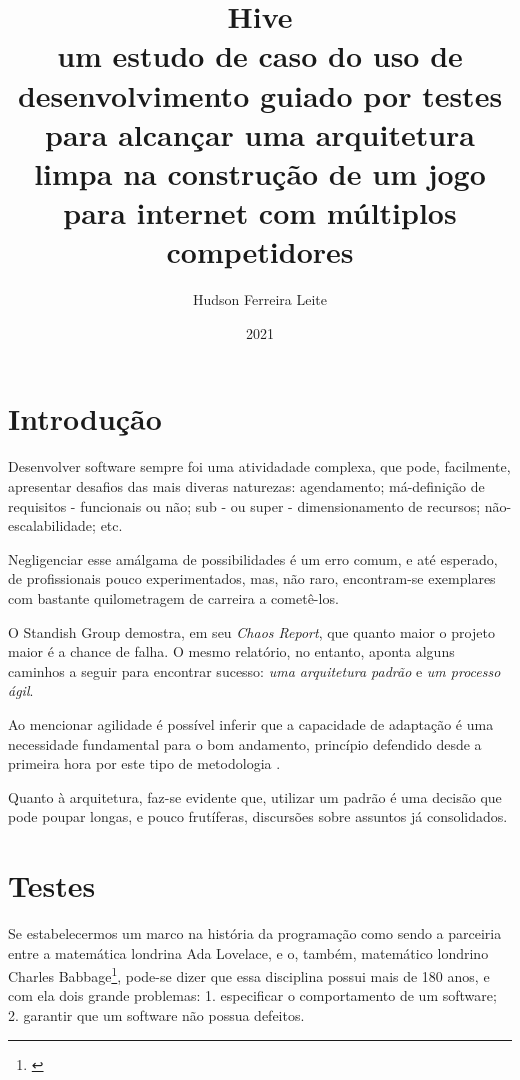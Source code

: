 \documentclass[12pt,a4paper,oneside,english,brazil]{article}
\title{
      \textbf{Hive} \\
      \large um estudo de caso do uso de desenvolvimento guiado por testes para
      alcançar uma arquitetura limpa na construção de um jogo para internet com
      múltiplos competidores
    }
\author{Hudson Ferreira Leite}
\date{2021}
\begin{document}
  \maketitle




  \clearpage

  \section{Introdução}

    Desenvolver software sempre foi uma atividadade complexa, que pode,
    facilmente,  apresentar desafios das mais diveras naturezas: agendamento;
    má-definição de  requisitos - funcionais ou não; sub - ou super -
    dimensionamento de recursos; não-escalabilidade; etc.

    Negligenciar esse amálgama de possibilidades é um erro comum, e até
    esperado, de profissionais pouco experimentados, mas, não raro,
    encontram-se exemplares com bastante quilometragem de carreira a
    cometê-los.

    O Standish Group demostra, em seu \emph{Chaos Report}\cite{ChaosReport2015},
    que quanto maior o projeto maior é a chance de falha. O mesmo relatório, no
    entanto, aponta alguns caminhos a seguir para encontrar sucesso: \emph{uma
    arquitetura padrão} e \emph{um processo ágil}.

    Ao mencionar agilidade é possível inferir que a capacidade de adaptação é
    uma  necessidade fundamental para o bom andamento, princípio defendido desde
    a  primeira hora por este tipo de metodologia \cite{ManifestoAgil2001}.

    Quanto à  arquitetura, faz-se evidente que, utilizar um padrão é uma decisão
    que  pode poupar longas, e pouco frutíferas, discursões sobre assuntos já
    consolidados.

  \section{Testes}

    Se estabelecermos um marco na história da programação como sendo a parceiria
    entre a matemática londrina Ada Lovelace, e o, também, matemático londrino
    Charles Babbage\footnote{\cite{Huskey1980}}, pode-se dizer que essa
    disciplina possui mais de 180 anos, e com ela dois grande problemas: 1.
    especificar o comportamento de um software; 2. garantir que um software não
    possua defeitos.
\end{document}

